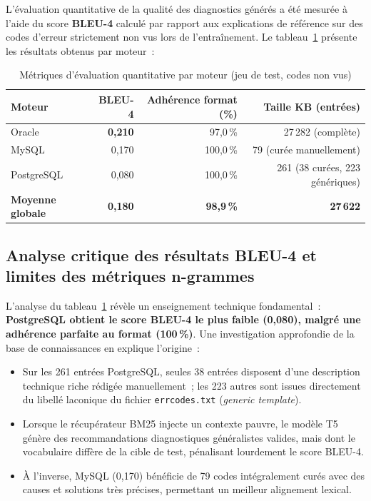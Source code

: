 \documentclass[12pt,a4paper]{report}
\begin{document}
L'\'evaluation quantitative de la qualit\'e des diagnostics g\'en\'er\'es a \'et\'e mesur\'ee
\`a l'aide du score \textbf{BLEU-4} calcul\'e par rapport aux explications de r\'ef\'erence
sur des codes d'erreur strictement non vus lors de l'entra\^inement. Le tableau~\ref{tab:bleu}
pr\'esente les r\'esultats obtenus par moteur~:

\begin{table}[H]
  \centering
  \caption{M\'etriques d'\'evaluation quantitative par moteur (jeu de test, codes non vus)}
  \label{tab:bleu}
  \begin{tabularx}{\textwidth}{lrrr}
    \toprule
    \textbf{Moteur} & \textbf{BLEU-4} & \textbf{Adh\'erence format (\%)} & \textbf{Taille KB (entr\'ees)} \\
    \midrule
    Oracle          & \textbf{0,210}  & 97,0\,\%                         & 27\,282 (compl\`ete) \\
    MySQL           & 0,170           & 100,0\,\%                        & 79 (cur\'ee manuellement) \\
    PostgreSQL      & 0,080           & 100,0\,\%                        & 261 (38 cur\'ees, 223 g\'en\'eriques) \\
    \midrule
    \textbf{Moyenne globale} & \textbf{0,180} & \textbf{98,9\,\%}       & \textbf{27\,622} \\
    \bottomrule
  \end{tabularx}
\end{table}

\subsection{Analyse critique des r\'esultats BLEU-4 et limites des m\'etriques n-grammes}

L'analyse du tableau~\ref{tab:bleu} r\'ev\`ele un enseignement technique fondamental~:
\textbf{PostgreSQL obtient le score BLEU-4 le plus faible (0,080), malgr\'e une adh\'erence
parfaite au format (100\,\%)}. Une investigation approfondie de la base de connaissances
en explique l'origine~:
\begin{itemize}[leftmargin=*]
  \item Sur les 261 entr\'ees PostgreSQL, seules 38 entr\'ees disposent d'une description
        technique riche r\'edig\'ee manuellement~; les 223 autres sont issues directement
        du libell\'e laconique du fichier \texttt{errcodes.txt} (\og{}\emph{generic template}\fg{}).
  \item Lorsque le r\'ecup\'erateur BM25 injecte un contexte pauvre, le mod\`ele T5
        g\'en\`ere des recommandations diagnostiques g\'en\'eralistes valides, mais dont le
        vocabulaire diff\`ere de la cible de test, p\'enalisant lourdement le score BLEU-4.
  \item \`A l'inverse, MySQL (0,170) b\'en\'eficie de 79 codes int\'egralement cur\'es avec
        des causes et solutions tr\`es pr\'ecises, permettant un meilleur alignement lexical.
\end{itemize}
\end{document}

